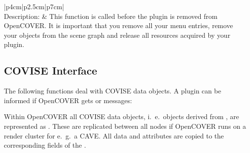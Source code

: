 \begin{longtable}{|p{4cm}|p{2.5cm}|p{7cm}|}
\hline
{}
{\bf {}}\\
\hline
{Description:} & 
        {This function is called before the plugin is removed from OpenCOVER.\newline
	 It is important that you remove all your menu entries,
         remove your objects from the scene graph and release all resources
         acquired by your plugin.
        }\\
\hline
\end{longtable}

\subsection{COVISE Interface}
\label{COVER:covise}

The following functions deal with COVISE data objects. A plugin can be 
informed if OpenCOVER gets  or  messages:

Within OpenCOVER all COVISE data objects, i.~e.\ objects derived from
, are represented as .
These are replicated between all nodes if OpenCOVER runs on a render cluster for e.~g.\ a CAVE.
All data and attributes are copied to the corresponding fields of the .

